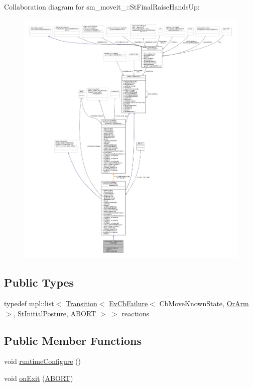 Collaboration diagram for sm\+\_\+moveit\+\_\+:\+:St\+Final\+Raise\+Hands\+Up\+:
\nopagebreak
\begin{figure}[H]
\begin{center}
\leavevmode
\includegraphics[width=350pt]{structsm__moveit__4_1_1StFinalRaiseHandsUp__coll__graph}
\end{center}
\end{figure}
\subsection*{Public Types}
\begin{DoxyCompactItemize}
\item 
typedef mpl\+::list$<$ \hyperlink{classsmacc_1_1Transition}{Transition}$<$ \hyperlink{structsmacc_1_1EvCbFailure}{Ev\+Cb\+Failure}$<$ Cb\+Move\+Known\+State, \hyperlink{classsm__moveit__4_1_1OrArm}{Or\+Arm} $>$, \hyperlink{structsm__moveit__4_1_1StInitialPosture}{St\+Initial\+Posture}, \hyperlink{structsmacc_1_1default__transition__tags_1_1ABORT}{A\+B\+O\+RT} $>$ $>$ \hyperlink{structsm__moveit__4_1_1StFinalRaiseHandsUp_a2d83997f06b11791828d8edb27724f2a}{reactions}
\end{DoxyCompactItemize}
\subsection*{Public Member Functions}
\begin{DoxyCompactItemize}
\item 
void \hyperlink{structsm__moveit__4_1_1StFinalRaiseHandsUp_abf2c776a0c87aca2f9bae83228f5c5a2}{runtime\+Configure} ()
\item 
void \hyperlink{structsm__moveit__4_1_1StFinalRaiseHandsUp_a6308a81e1d4251065cae7c03f8a47bbf}{on\+Exit} (\hyperlink{structsmacc_1_1default__transition__tags_1_1ABORT}{A\+B\+O\+RT})
\end{DoxyCompactItemize}
